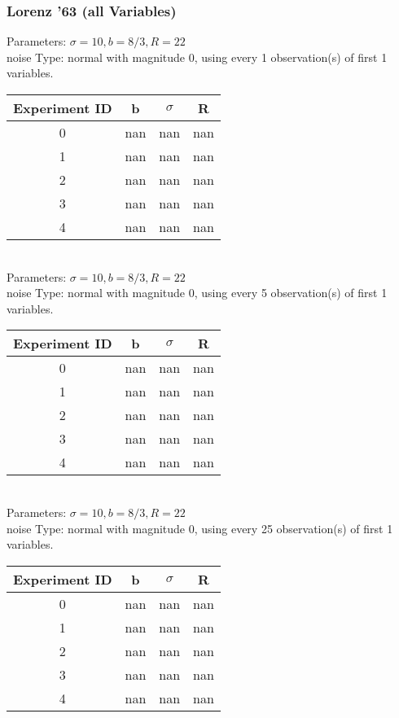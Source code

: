 \begin{multicols}{3} 
\tiny 

\subsubsection{Lorenz '63 (all Variables)}
Parameters: $\sigma=10, b=8/3, R=22$\\
noise Type: normal with magnitude 0, using every 1 observation(s) of first 1 variables.\\
\begin{tabular}{cccc}
\hline Experiment ID & b & $\sigma$ & R \\ \hline 
0 & nan & nan & nan\\ \hline 
 1 & nan & nan & nan\\ \hline 
 2 & nan & nan & nan\\ \hline 
 3 & nan & nan & nan\\ \hline 
 4 & nan & nan & nan\\ \hline 
 \end{tabular}\\
Parameters: $\sigma=10, b=8/3, R=22$\\
noise Type: normal with magnitude 0, using every 5 observation(s) of first 1 variables.\\
\begin{tabular}{cccc}
\hline Experiment ID & b & $\sigma$ & R \\ \hline 
0 & nan & nan & nan\\ \hline 
 1 & nan & nan & nan\\ \hline 
 2 & nan & nan & nan\\ \hline 
 3 & nan & nan & nan\\ \hline 
 4 & nan & nan & nan\\ \hline 
 \end{tabular}\\
Parameters: $\sigma=10, b=8/3, R=22$\\
noise Type: normal with magnitude 0, using every 25 observation(s) of first 1 variables.\\
\begin{tabular}{cccc}
\hline Experiment ID & b & $\sigma$ & R \\ \hline 
0 & nan & nan & nan\\ \hline 
 1 & nan & nan & nan\\ \hline 
 2 & nan & nan & nan\\ \hline 
 3 & nan & nan & nan\\ \hline 
 4 & nan & nan & nan\\ \hline 

\end{tabular}
\end{multicols}
